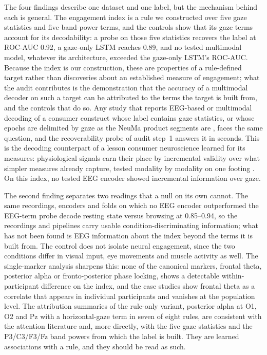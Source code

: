 \documentclass[pdflatex,sn-basic,Numbered,twocolumn,iicol]{sn-jnl}
\theoremstyle{thmstyleone}%
\theoremstyle{thmstyletwo}%
\theoremstyle{thmstylethree}%
\begin{document}
The four findings describe one dataset and one label, but the mechanism behind each is general. The engagement index is a rule we constructed over five gaze statistics and five band-power terms, and the controls show that its gaze terms account for its decodability: a probe on those five statistics recovers the label at ROC-AUC 0.92, a gaze-only LSTM reaches 0.89, and no tested multimodal model, whatever its architecture, exceeded the gaze-only LSTM's ROC-AUC. Because the index is our construction, these are properties of a rule-defined target rather than discoveries about an established measure of engagement; what the audit contributes is the demonstration that the accuracy of a multimodal decoder on such a target can be attributed to the terms the target is built from, and the controls that do so. Any study that reports EEG-based or multimodal decoding of a consumer construct whose label contains gaze statistics, or whose epochs are delimited by gaze as the NeuMa product segments are \cite{ref35}, faces the same question, and the recoverability probe of audit step~1 answers it in seconds. This is the decoding counterpart of a lesson consumer neuroscience learned for its measures: physiological signals earn their place by incremental validity over what simpler measures already capture, tested modality by modality on one footing \cite{ref65}. On this index, no tested EEG encoder showed incremental information over gaze.

The second finding separates two readings that a null on its own cannot. The same recordings, encoders and folds on which no EEG encoder outperformed the EEG-term probe decode resting state versus browsing at 0.85--0.94, so the recordings and pipelines carry usable condition-discriminating information; what has not been found is EEG information about the index beyond the terms it is built from. The control does not isolate neural engagement, since the two conditions differ in visual input, eye movements and muscle activity as well. The single-marker analysis sharpens this: none of the canonical markers, frontal theta, posterior alpha or fronto-posterior phase locking, shows a detectable within-participant difference on the index, and the case studies show frontal theta as a correlate that appears in individual participants and vanishes at the population level. The attribution summaries of the rule-only variant, posterior alpha at O1, O2 and Pz with a horizontal-gaze term in seven of eight rules, are consistent with the attention literature \cite{ref1,ref8} and, more directly, with the five gaze statistics and the P3/C3/F3/Fz band powers from which the label is built. They are learned associations with a rule, and they should be read as such.
\end{document}

